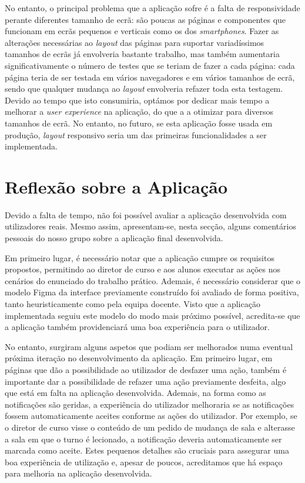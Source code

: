 \documentclass[12pt, a4paper]{article}
\begin{document}
No entanto, o principal problema que a aplicação sofre é a falta de responsividade perante
diferentes tamanho de ecrã: são poucas as páginas e componentes que funcionam em ecrãs pequenos e
verticais como os dos \emph{smartphones}. Fazer as alterações necessárias ao \emph{layout} das
páginas para suportar variadíssimos tamanhos de ecrãs já envolveria bastante trabalho, mas também
aumentaria significativamente o número de testes que se teriam de fazer a cada página: cada página
teria de ser testada em vários navegadores e em vários tamanhos de ecrã, sendo que qualquer mudança
ao \emph{layout} envolveria refazer toda esta testagem. Devido ao tempo que isto consumiria, optámos
por dedicar mais tempo a melhorar a \emph{user experience} na aplicação, do que a a otimizar para
diversos tamanhos de ecrã. No entanto, no futuro, se esta aplicação fosse usada em produção,
\emph{layout} responsivo seria um das primeiras funcionalidades a ser implementada.

\section{Reflexão sobre a Aplicação}

Devido a falta de tempo, não foi possível avaliar a aplicação desenvolvida com utilizadores reais.
Mesmo assim, apresentam-se, nesta secção, alguns comentários pessoais do nosso grupo sobre a
aplicação final desenvolvida.

Em primeiro lugar, é necessário notar que a aplicação cumpre os requisitos propostos, permitindo ao
diretor de curso e aos alunos executar as ações nos cenários do enunciado do trabalho prático.
Ademais, é necessário considerar que o modelo Figma da interface previamente construído foi avaliado
de forma positiva, tanto heuristicamente como pela equipa docente. Visto que a aplicação
implementada seguiu este modelo do modo mais próximo possível, acredita-se que a aplicação também
providenciará uma boa experiência para o utilizador.

No entanto, surgiram alguns aspetos que podiam ser melhorados numa eventual próxima iteração no
desenvolvimento da aplicação. Em primeiro lugar, em páginas que dão a possibilidade ao utilizador de
desfazer uma ação, também é importante dar a possibilidade de refazer uma ação previamente desfeita,
algo que está em falta na aplicação desenvolvida. Ademais, na forma como as notificações são
geridas, a experiência do utilizador melhoraria se as notificações fossem automaticamente aceites
conforme as ações do utilizador. Por exemplo, se o diretor de curso visse o conteúdo de um pedido de
mudança de sala e alterasse a sala em que o turno é lecionado, a notificação deveria automaticamente
ser marcada como aceite. Estes pequenos detalhes são cruciais para assegurar uma boa experiência
de utilização e, apesar de poucos, acreditamos que há espaço para melhoria na aplicação
desenvolvida.
\end{document}
